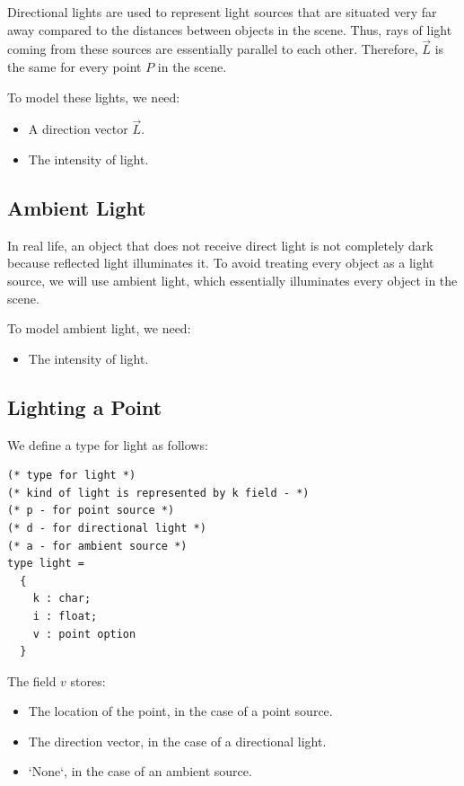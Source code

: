 \documentclass[conference]{IEEEtran}
\begin{document}
Directional lights are used to represent light sources that are situated very far away compared to the distances between objects in the scene. Thus, rays of light coming from these sources are essentially parallel to each other. Therefore, $\vec{L}$ is the same for every point $P$ in the scene.

To model these lights, we need:
\begin{itemize}
    \item A direction vector $\vec{L}$.
    \item The intensity of light.
\end{itemize}

\subsection{Ambient Light}

In real life, an object that does not receive direct light is not completely dark because reflected light illuminates it. To avoid treating every object as a light source, we will use ambient light, which essentially illuminates every object in the scene.

To model ambient light, we need:
\begin{itemize}
    \item The intensity of light.
\end{itemize}

\subsection{Lighting a Point}

We define a type for light as follows:

\begin{lstlisting}
(* type for light *)
(* kind of light is represented by k field - *)
(* p - for point source *)
(* d - for directional light *)
(* a - for ambient source *)
type light = 
  {
    k : char;
    i : float;
    v : point option
  }
\end{lstlisting}

The field $v$ stores:
\begin{itemize}
    \item The location of the point, in the case of a point source.
    \item The direction vector, in the case of a directional light.
    \item `None`, in the case of an ambient source.
\end{itemize}
\end{document}
